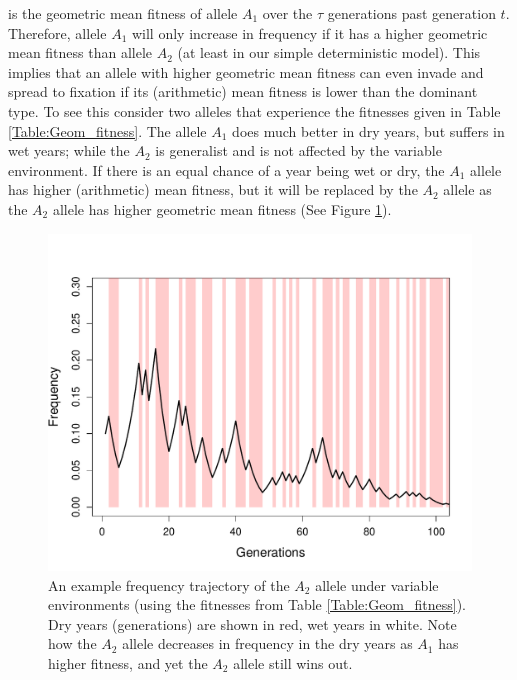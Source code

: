 is the geometric mean fitness of allele
 $A_1$ over the $\tau$ generations past generation $t$. Therefore, allele $A_1$ will only increase
in frequency if it has a higher geometric mean fitness than allele $A_2$
(at least in our simple deterministic model). This implies that an allele with higher
geometric mean fitness can even invade and spread to fixation if its
(arithmetic) mean fitness is lower than the dominant type.  To see
this consider two alleles that experience the fitnesses given in Table
\ref{Table:Geom_fitness}. The allele $A_1$ does much better in
dry years, but suffers in wet years; while the $A_2$ is generalist and
is not affected by the variable environment. If there is an equal
chance of a year being wet or dry, the $A_1$ allele has
higher (arithmetic) mean fitness, but it will be replaced by the $A_2$
allele as the $A_2$ allele has higher geometric mean fitness (See Figure \ref{fig:haploid_geo}). \\

\begin{figure}
\begin{center}
\includegraphics[width= \textwidth]{figures/Haploid_geom_traj.pdf}
\end{center}
\caption{An example frequency trajectory of the $A_2$ allele under
  variable environments (using the fitnesses from Table \ref{Table:Geom_fitness}). Dry years (generations) are shown in red, wet
  years in white. Note how the $A_2$ allele decreases in frequency in
  the dry years as $A_1$ has higher fitness, and yet the $A_2$ allele
  still wins out. 
  } \label{fig:haploid_geo}
\end{figure}

